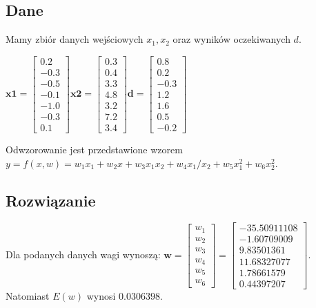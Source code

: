 \documentclass{article}
\begin{document}
\subsection{Dane}
Mamy zbiór danych wejściowych $x_1, x_2$ oraz wyników oczekiwanych $d$.
\begin{center}
$  
\textbf{x1} = 
    \begin{bmatrix}
        0.2 \\ -0.3 \\ -0.5 \\ -0.1 \\ -1.0 \\ -0.3 \\ 0.1
    \end{bmatrix} 
\textbf{x2} = 
    \begin{bmatrix}
        0.3 \\ 0.4 \\ 3.3 \\ 4.8 \\ 3.2 \\ 7.2 \\ 3.4
    \end{bmatrix} 
\textbf{d} = 
    \begin{bmatrix}
        0.8 \\ 0.2 \\ -0.3 \\ 1.2 \\ 1.6 \\ 0.5 \\ -0.2
    \end{bmatrix} 
$
\end{center}
Odwzorowanie jest przedstawione wzorem $y = f(x, w) = w_1x_1 + w_2x + w_3x_1x_2 + w_4x_1/x_2 +w_5x_1^2 +w_6x_2^2$.

\subsection{Rozwiązanie}
Dla podanych danych wagi wynoszą:
$
\textbf{w} = 
    \begin{bmatrix}
        w_1 \\ w_2 \\ w_3 \\ w_4 \\ w_5 \\ w_6
    \end{bmatrix}
=
    \begin{bmatrix}
        -35.50911108 \\ -1.60709009 \\ 9.83501361 \\ 11.68327077 \\ 1.78661579 \\ 0.44397207
    \end{bmatrix}
$.
Natomiast $E(w)$ wynosi $0.0306398$.
\end{document}
